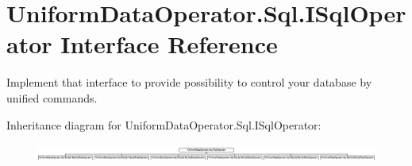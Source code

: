 \hypertarget{interface_uniform_data_operator_1_1_sql_1_1_i_sql_operator}{}\section{Uniform\+Data\+Operator.\+Sql.\+I\+Sql\+Operator Interface Reference}
\label{interface_uniform_data_operator_1_1_sql_1_1_i_sql_operator}


Implement that interface to provide possibility to control your database by unified commands.  


Inheritance diagram for Uniform\+Data\+Operator.\+Sql.\+I\+Sql\+Operator\+:\begin{figure}[H]
\begin{center}
\leavevmode
\includegraphics[height=0.590717cm]{d1/dad/interface_uniform_data_operator_1_1_sql_1_1_i_sql_operator}
\end{center}
\end{figure}
